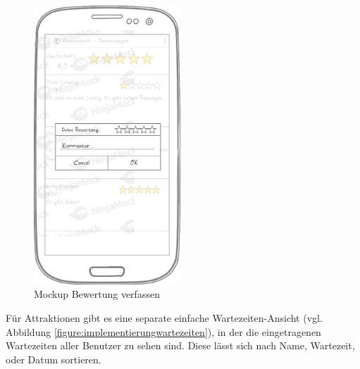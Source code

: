 \begin{figure}[h]
\begin{minipage}{0.49\textwidth}
        \includegraphics[width=0.49\textwidth]{img/mockups/m_bewertung_verfassen.png}
        \caption{Mockup Bewertung verfassen}
    \end{minipage}
\end{figure}

Für Attraktionen gibt es eine separate einfache Wartezeiten-Ansicht (vgl. Abbildung 
\ref{figure:implementierungwartezeiten}), in der die eingetragenen 
Wartezeiten aller Benutzer zu sehen sind. Diese lässt sich nach Name, Wartezeit, oder Datum 
sortieren.

